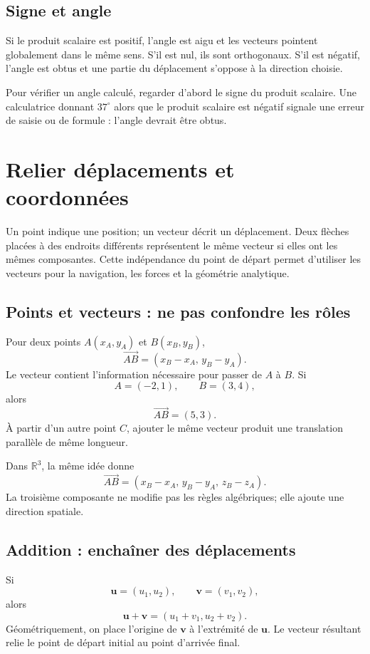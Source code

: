 \documentclass[12pt,a4paper,openany]{book}
\newcommand{\R}{\mathbb{R}}
\newcommand{\vect}[1]{\overrightarrow{#1}}
\begin{document}
\subsection{Signe et angle}
Si le produit scalaire est positif, l'angle est aigu et les vecteurs pointent globalement dans le même sens. S'il est nul, ils sont orthogonaux. S'il est négatif, l'angle est obtus et une partie du déplacement s'oppose à la direction choisie.

\begin{visualbox}
Pour vérifier un angle calculé, regarder d'abord le signe du produit scalaire. Une calculatrice donnant $37^\circ$ alors que le produit scalaire est négatif signale une erreur de saisie ou de formule : l'angle devrait être obtus.
\end{visualbox}


\section{Relier déplacements et coordonnées}

Un point indique une position; un vecteur décrit un déplacement. Deux flèches placées à des endroits différents représentent le même vecteur si elles ont les mêmes composantes. Cette indépendance du point de départ permet d'utiliser les vecteurs pour la navigation, les forces et la géométrie analytique.

\subsection{Points et vecteurs : ne pas confondre les rôles}

Pour deux points $A(x_A,y_A)$ et $B(x_B,y_B)$,
\[
\vect{AB}=(x_B-x_A,\,y_B-y_A).
\]
Le vecteur contient l'information nécessaire pour passer de $A$ à $B$. Si
\[
A=(-2,1),\qquad B=(3,4),
\]
alors
\[
\vect{AB}=(5,3).
\]
À partir d'un autre point $C$, ajouter le même vecteur produit une translation parallèle de même longueur.

Dans $\R^3$, la même idée donne
\[
\vect{AB}=(x_B-x_A,\,y_B-y_A,\,z_B-z_A).
\]
La troisième composante ne modifie pas les règles algébriques; elle ajoute une direction spatiale.

\subsection{Addition : enchaîner des déplacements}

Si
\[
\mathbf u=(u_1,u_2),
\qquad
\mathbf v=(v_1,v_2),
\]
alors
\[
\mathbf u+\mathbf v=(u_1+v_1,u_2+v_2).
\]
Géométriquement, on place l'origine de $\mathbf v$ à l'extrémité de $\mathbf u$. Le vecteur résultant relie le point de départ initial au point d'arrivée final.
\end{document}

